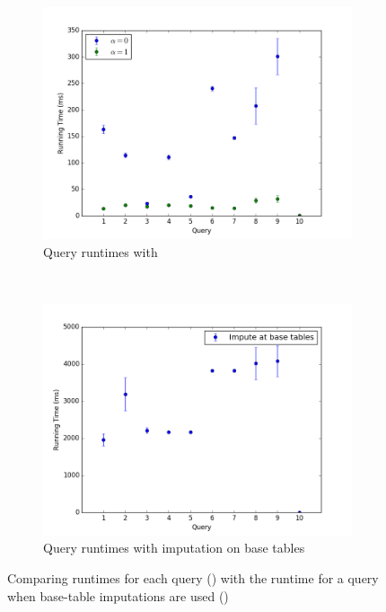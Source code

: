 \begin{figure}
\begin{subfigure}{\linewidth}
\includegraphics[width=\columnwidth]{figures/running_times_imputedb.png}
\caption{Query runtimes with \ProjectName{}}
\label{subfig:project-runtime-queries}
\end{subfigure}
~
\begin{subfigure}{\linewidth}
\includegraphics[width=\columnwidth]{figures/running_times_base_tables.png}
\caption{Query runtimes with imputation on base tables}
\label{subfig:base-runtime-queries}
\end{subfigure}
\caption{Comparing \ProjectName{} runtimes for each query
    () with the runtime for a query when base-table
    imputations are used ()}
\label{fig:runtimes}
\end{figure}


